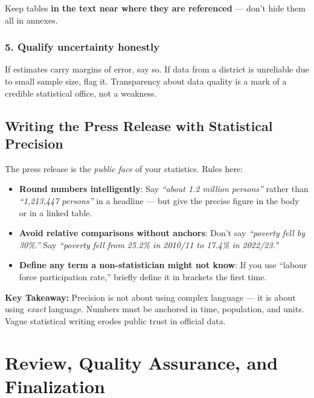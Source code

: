 \documentclass[11pt,a4paper,oneside]{book}
\begin{document}
Keep tables \textbf{in the text near where they are referenced} --- don't hide them all in annexes.

\subsection*{5. Qualify uncertainty honestly}

If estimates carry margins of error, say so. If data from a district is unreliable due to small sample size, flag it. Transparency about data quality is a mark of a credible statistical office, not a weakness.

\section{Writing the Press Release with Statistical Precision}

The press release is the \emph{public face} of your statistics. Rules here:

\begin{itemize}
    \item \textbf{Round numbers intelligently}: Say \emph{``about 1.2 million persons''} rather than \emph{``1,213,447 persons''} in a headline --- but give the precise figure in the body or in a linked table.
    \item \textbf{Avoid relative comparisons without anchors}: Don't say \emph{``poverty fell by 30\%.''} Say \emph{``poverty fell from 25.2\% in 2010/11 to 17.4\% in 2022/23.''}
    \item \textbf{Define any term a non-statistician might not know}: If you use ``labour force participation rate,'' briefly define it in brackets the first time.
\end{itemize}

\begin{tcolorbox}[nsolightbox]
\textbf{Key Takeaway:} Precision is not about using complex language --- it is about using \emph{exact} language. Numbers must be anchored in time, population, and units. Vague statistical writing erodes public trust in official data.
\end{tcolorbox}


\chapter{Review, Quality Assurance, and Finalization}
\end{document}
